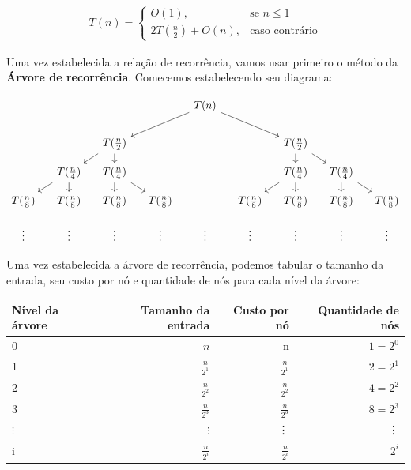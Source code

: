 \begin{align*}
	T(n) =
	\begin{cases}
		O(1),                   & \text{se $n \leq 1$}  \\
		2T(\frac{n}{2}) + O(n), & \text{caso contrário}
	\end{cases}
\end{align*}

Uma vez estabelecida a relação de recorrência, vamos usar primeiro o método da \textbf{Árvore de recorrência}. Comecemos estabelecendo seu diagrama:

\[\begin{tikzcd}[sep=small]
		&&&& {T(n)} \\
		\\
		&& {T(\frac{n}{2})} &&&& {T(\frac{n}{2})} \\
		& {T(\frac{n}{4})} & {T(\frac{n}{4})} &&&& {T(\frac{n}{4})} & {T(\frac{n}{4})} \\
		{T(\frac{n}{8})} & {T(\frac{n}{8})} & {T(\frac{n}{8})} & {T(\frac{n}{8})} && {T(\frac{n}{8})} & {T(\frac{n}{8})} & {T(\frac{n}{8})} & {T(\frac{n}{8})} \\
		\vdots & \vdots & \vdots & \vdots & \vdots & \vdots & \vdots & \vdots & \vdots
		\arrow[from=1-5, to=3-3]
		\arrow[from=1-5, to=3-7]
		\arrow[from=3-3, to=4-2]
		\arrow[from=3-3, to=4-3]
		\arrow[from=3-7, to=4-7]
		\arrow[from=3-7, to=4-8]
		\arrow[from=4-2, to=5-1]
		\arrow[from=4-2, to=5-2]
		\arrow[from=4-3, to=5-3]
		\arrow[from=4-3, to=5-4]
		\arrow[from=4-7, to=5-6]
		\arrow[from=4-7, to=5-7]
		\arrow[from=4-8, to=5-8]
		\arrow[from=4-8, to=5-9]
	\end{tikzcd}\]
\FloatBarrier

Uma vez estabelecida a árvore de recorrência, podemos tabular o tamanho da entrada, seu custo por nó e quantidade de nós para cada nível da árvore:


\begin{table}[h!]
	\centering
	\begin{tabular}{lrrr}
		\toprule
		Nível da árvore & Tamanho da entrada & Custo por nó    & Quantidade de nós \\
		\midrule
		0               & $n$                & n               & $1 = 2^0$         \\
		1               & $\frac{n}{2^1}$    & $\frac{n}{2^1}$ & $2 = 2^1$         \\
		2               & $\frac{n}{2^2}$    & $\frac{n}{2^2}$ & $4 = 2^2$         \\
		3               & $\frac{n}{2^3}$    & $\frac{n}{2^3}$ & $8 = 2^3$         \\
		$\vdots$        & $\vdots$           & \vdots          & \vdots            \\
		i               & $\frac{n}{2^i}$    & $\frac{n}{2^i}$ & $2^i$             \\
		\bottomrule
	\end{tabular}
\end{table}
\FloatBarrier

